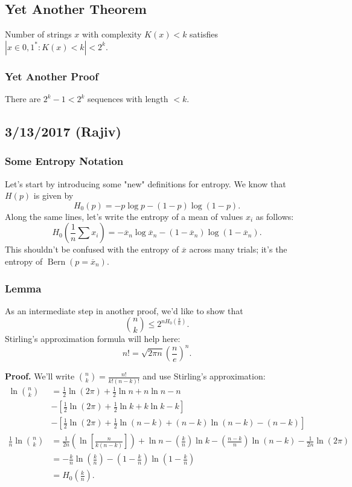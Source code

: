 \documentclass[11pt]{article}
\theoremstyle{definition}
\begin{document}
\subsection{Yet Another Theorem}
\theorem{} Number of strings $x$ with complexity $K(x) < k$ satisfies $|{x \in {0, 1}^*: K(x) < k}| < 2^k$.
\subsubsection{Yet Another Proof}
There are $2^k-1 < 2^k$ sequences with length $< k$.

\subsection{3/13/2017 (Rajiv)}

\subsubsection{Some Entropy Notation}

Let's start by introducing some "new" definitions for entropy. We know that $H(p)$ is given by $$H_0(p) = -p\log p - (1-p)\log(1-p).$$ Along the same lines, let's write the entropy of a mean of values $x_i$ as follows: $$H_0\left(\frac{1}{n}\sum x_i\right) = -\overline{x}_n \log \overline{x}_n - (1-\overline{x}_n)\log(1-\overline{x}_n).$$ This shouldn't be confused with the entropy of $\overline{x}$ across many trials; it's the entropy of $\operatorname{Bern}(p = \overline{x}_n)$.

\subsubsection{Lemma}

As an intermediate step in another proof, we'd like to show that $$\binom{n}{k} \le 2^{nH_0(\frac{k}{n})}.$$ Stirling's approximation formula will help here: $$n! = \sqrt{2\pi n} \left(\frac{n}{e}\right)^n.$$

\textbf{Proof.} We'll write $\binom{n}{k} = \frac{n!}{k!(n-k)!}$ and use Stirling's approximation:
\begin{align*}
\ln \binom{n}{k} &= \frac{1}{2} \ln (2\pi) + \frac{1}{2} \ln n + n \ln n - n \\
&-\left[ \frac12 \ln(2\pi) + \frac12 \ln k + k \ln k - k \right] \\
&-\left[\frac12 \ln(2\pi) + \frac12 \ln(n-k) + (n-k)\ln(n-k) - (n-k)\right] \\
\frac 1n \ln \binom nk &= \frac{1}{2n}\left(\ln\left[\frac{n}{k(n-k)}\right]\right) + \ln n - \left(\frac kn\right) \ln k - \left(\frac{n-k}{n}\right) \ln(n-k) - \frac{1}{2n}\ln(2\pi) \\
&= -\frac{k}{n}\ln\left(\frac kn\right) - \left(1 - \frac kn\right) \ln \left(1 - \frac kn\right) \\
&= H_0\left(\frac kn\right).
\end{align*}
\end{document}
